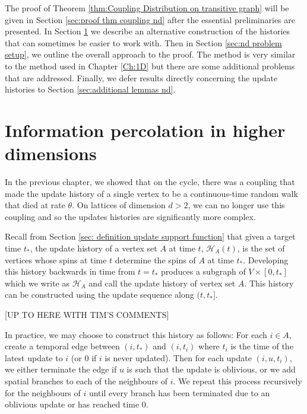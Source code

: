 The proof of Theorem \ref{thm:Coupling Distribution on transitive graph} will be given in Section \ref{sec:proof thm coupling nd} after the essential preliminaries are presented. In Section \ref{sec:information percolation in higher dimensions} we describe an alternative construction of the histories that can sometimes be easier to work with. Then in Section \ref{sec:nd problem setup}, we outline the overall approach to the proof. The method is very similar to the method used in Chapter \ref{Ch:1D} but there are some additional problems that are addressed. Finally, we defer results directly concerning the update histories to Section \ref{sec:additional lemmas nd}.

\section{Information percolation in higher dimensions}
\label{sec:information percolation in higher dimensions}
In the previous chapter, we showed that on the cycle, there was a coupling that made the update history of a single vertex to be a continuous-time random walk that died at rate $\theta$. On lattices of dimension $d > 2$, we can no longer use this coupling and so the updates histories are significantly more complex. 

Recall from Section \ref{sec: definition update support function} that given a target time $t_*$, the update history of a vertex set $A$ at time $t$, $\mathcal{H}_A(t)$, is the set of vertices whose spins at time $t$ determine the spins of $A$ at time $t_*$. Developing this history backwards in time from $t = t_*$ produces a subgraph of $V \times [0, t_*]$ which we write as $\mathcal{H}_A$ and call the update history of vertex set $A$. This history can be constructed using the update sequence along $(t, t_*]$. 

[UP TO HERE WITH TIM'S COMMENTS] 

In practice, we may choose to construct this history as follows: For each $i \in A$, create a temporal edge between $(i, t_*)$ and $(i, t_i)$ where $t_i$ is the time of the latest update to $i$ (or $0$ if $i$ is never updated). Then for each update $(i, u, t_i)$, we either terminate the edge if $u$ is such that the update is oblivious, or we add spatial branches to each of the neighbours of $i$. We repeat this process recursively for the neighbours of $i$ until every branch has been terminated due to an oblivious update or has reached time $0$.

